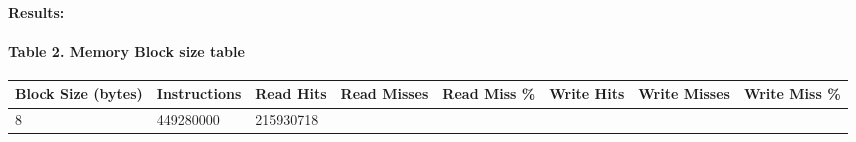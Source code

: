\documentclass[11pt]{article}
\begin{document}
\paragraph{Results:}\label{results}

\paragraph{Table 2. Memory Block size
table}\label{table-2.-memory-block-size-table}

\begin{longtable}[]{@{}llllllll@{}}
\toprule
\begin{minipage}[b]{0.14\columnwidth}\raggedright\strut
Block Size (bytes)\strut
\end{minipage} & \begin{minipage}[b]{0.10\columnwidth}\raggedright\strut
Instructions\strut
\end{minipage} & \begin{minipage}[b]{0.08\columnwidth}\raggedright\strut
Read Hits\strut
\end{minipage} & \begin{minipage}[b]{0.09\columnwidth}\raggedright\strut
Read Misses\strut
\end{minipage} & \begin{minipage}[b]{0.09\columnwidth}\raggedright\strut
Read Miss \%\strut
\end{minipage} & \begin{minipage}[b]{0.09\columnwidth}\raggedright\strut
Write Hits\strut
\end{minipage} & \begin{minipage}[b]{0.10\columnwidth}\raggedright\strut
Write Misses\strut
\end{minipage} & \begin{minipage}[b]{0.10\columnwidth}\raggedright\strut
Write Miss \%\strut
\end{minipage}\tabularnewline
\midrule
\endhead
\begin{minipage}[t]{0.14\columnwidth}\raggedright\strut
8\strut
\end{minipage} & \begin{minipage}[t]{0.10\columnwidth}\raggedright\strut
449280000\strut
\end{minipage} & \begin{minipage}[t]{0.08\columnwidth}\raggedright\strut
215930718\strut
\end{minipage} & \begin{minipage}[t]{0.09\columnwidth}\raggedright\strut

\end{minipage}
\end{longtable}
\end{document}
